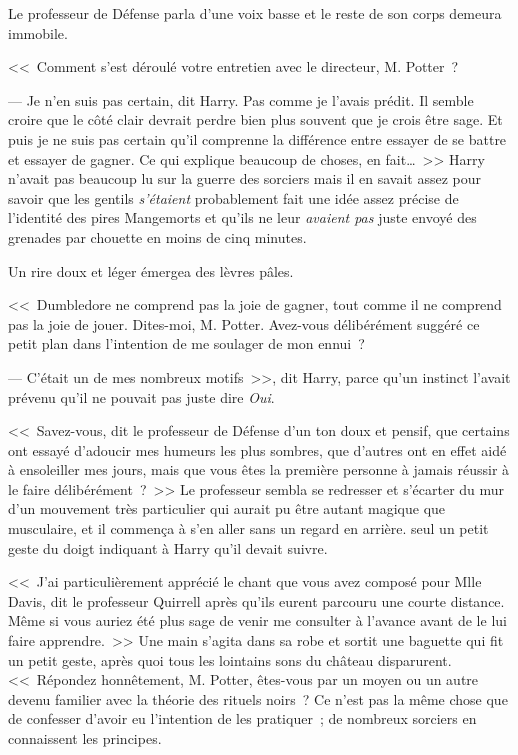 Le professeur de Défense parla d'une voix basse et le reste de son corps demeura immobile.

<<~Comment s'est déroulé votre entretien avec le directeur, M. Potter~?

--- Je n'en suis pas certain, dit Harry. Pas comme je l'avais prédit. Il semble croire que le côté clair devrait perdre bien plus souvent que je crois être sage. Et puis je ne suis pas certain qu'il comprenne la différence entre essayer de se battre et essayer de gagner. Ce qui explique beaucoup de choses, en fait…~>> Harry n'avait pas beaucoup lu sur la guerre des sorciers mais il en savait assez pour savoir que les gentils \emph{s'étaient} probablement fait une idée assez précise de l'identité des pires Mangemorts et qu'ils ne leur \emph{avaient pas} juste envoyé des grenades par chouette en moins de cinq minutes.

Un rire doux et léger émergea des lèvres pâles.

<<~Dumbledore ne comprend pas la joie de gagner, tout comme il ne comprend pas la joie de jouer. Dites-moi, M. Potter. Avez-vous délibérément suggéré ce petit plan dans l'intention de me soulager de mon ennui~?

--- C'était un de mes nombreux motifs~>>, dit Harry, parce qu'un instinct l'avait prévenu qu'il ne pouvait pas juste dire \emph{Oui}.

<<~Savez-vous, dit le professeur de Défense d'un ton doux et pensif, que certains ont essayé d'adoucir mes humeurs les plus sombres, que d'autres ont en effet aidé à ensoleiller mes jours, mais que vous êtes la première personne à jamais réussir à le faire délibérément~?~>> Le professeur sembla se redresser et s'écarter du mur d'un mouvement très particulier qui aurait pu être autant magique que musculaire, et il commença à s'en aller sans un regard en arrière. seul un petit geste du doigt indiquant à Harry qu'il devait suivre.

<<~J'ai particulièrement apprécié le chant que vous avez composé pour Mlle Davis, dit le professeur Quirrell après qu'ils eurent parcouru une courte distance. Même si vous auriez été plus sage de venir me consulter à l'avance avant de le lui faire apprendre.~>> Une main s'agita dans sa robe et sortit une baguette qui fit un petit geste, après quoi tous les lointains sons du château disparurent. <<~Répondez honnêtement, M. Potter, êtes-vous par un moyen ou un autre devenu familier avec la théorie des rituels noirs~? Ce n'est pas la même chose que de confesser d'avoir eu l'intention de les pratiquer~; de nombreux sorciers en connaissent les principes.

